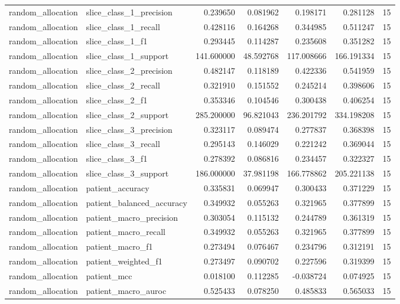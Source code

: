 \begin{tabular}{llrrrrr}
random_allocation & slice_class_1_precision & 0.239650 & 0.081962 & 0.198171 & 0.281128 & 15 \\
random_allocation & slice_class_1_recall & 0.428116 & 0.164268 & 0.344985 & 0.511247 & 15 \\
random_allocation & slice_class_1_f1 & 0.293445 & 0.114287 & 0.235608 & 0.351282 & 15 \\
random_allocation & slice_class_1_support & 141.600000 & 48.592768 & 117.008666 & 166.191334 & 15 \\
random_allocation & slice_class_2_precision & 0.482147 & 0.118189 & 0.422336 & 0.541959 & 15 \\
random_allocation & slice_class_2_recall & 0.321910 & 0.151552 & 0.245214 & 0.398606 & 15 \\
random_allocation & slice_class_2_f1 & 0.353346 & 0.104546 & 0.300438 & 0.406254 & 15 \\
random_allocation & slice_class_2_support & 285.200000 & 96.821043 & 236.201792 & 334.198208 & 15 \\
random_allocation & slice_class_3_precision & 0.323117 & 0.089474 & 0.277837 & 0.368398 & 15 \\
random_allocation & slice_class_3_recall & 0.295143 & 0.146029 & 0.221242 & 0.369044 & 15 \\
random_allocation & slice_class_3_f1 & 0.278392 & 0.086816 & 0.234457 & 0.322327 & 15 \\
random_allocation & slice_class_3_support & 186.000000 & 37.981198 & 166.778862 & 205.221138 & 15 \\
random_allocation & patient_accuracy & 0.335831 & 0.069947 & 0.300433 & 0.371229 & 15 \\
random_allocation & patient_balanced_accuracy & 0.349932 & 0.055263 & 0.321965 & 0.377899 & 15 \\
random_allocation & patient_macro_precision & 0.303054 & 0.115132 & 0.244789 & 0.361319 & 15 \\
random_allocation & patient_macro_recall & 0.349932 & 0.055263 & 0.321965 & 0.377899 & 15 \\
random_allocation & patient_macro_f1 & 0.273494 & 0.076467 & 0.234796 & 0.312191 & 15 \\
random_allocation & patient_weighted_f1 & 0.273497 & 0.090702 & 0.227596 & 0.319399 & 15 \\
random_allocation & patient_mcc & 0.018100 & 0.112285 & -0.038724 & 0.074925 & 15 \\
random_allocation & patient_macro_auroc & 0.525433 & 0.078250 & 0.485833 & 0.565033 & 15 \\

\end{tabular}
